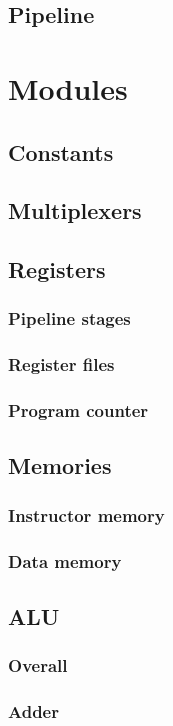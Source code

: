 \documentclass[11pt, a4paper, twoside]{article}
\begin{document}
\subsection{Pipeline}
	
\section{Modules}
\subsection{Constants}
\subsection{Multiplexers}
\subsection{Registers}
\subsubsection{Pipeline stages}
\subsubsection{Register files}
\subsubsection{Program counter}
\subsection{Memories}
\subsubsection{Instructor memory}
\subsubsection{Data memory}
\subsection{ALU}
\subsubsection{Overall}
\subsubsection{Adder}
\end{document}
